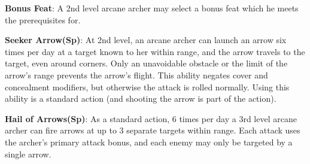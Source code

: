 \textbf{Bonus Feat}: A 2nd level arcane archer may select a bonus feat which he meets the prerequisites for.

\textbf{Seeker Arrow(Sp)}: At 2nd level, an arcane archer can launch an arrow six times per day at a target known to her within range, and the arrow travels to the target, even around corners. Only an unavoidable obstacle or the limit of the arrow’s range prevents the arrow’s flight. This ability negates cover and concealment modifiers, but otherwise the attack is rolled normally. Using this ability is a standard action (and shooting the arrow is part of the action).

\textbf{Hail of Arrows(Sp)}: As a standard action, 6 times per day a 3rd level arcane archer can fire arrows at up to 3 separate targets within range. Each attack uses the archer's primary attack bonus, and each enemy may only be targeted by a single arrow.